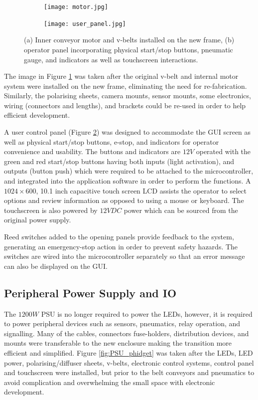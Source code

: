 \documentclass[fleqn,twoside,12pt]{report}
\begin{document}
\begin{figure}[h]
	\centering
	\begin{subfigure}{0.5\textwidth}
		\centering
		\texttt{[image: motor.jpg]}
		\caption{}
		\label{fig:motor}
	\end{subfigure}%
	\begin{subfigure}{0.5\textwidth}
		\centering
		\texttt{[image: user\_panel.jpg]}
		\caption{}
		\label{fig:user_panel}
	\end{subfigure}%
	\caption{(a) Inner conveyor motor and v-belts installed on the new frame, (b) operator panel incorporating physical start/stop buttons, pneumatic gauge, and indicators as well as touchscreen interactions.}
	\label{}
\end{figure}

The image in Figure \ref{fig:motor} was taken after the original v-belt and internal motor system were installed on the new frame, eliminating the need for re-fabrication. Similarly, the polarising sheets, camera mounts, sensor mounts, some electronics, wiring (connectors and lengths), and brackets could be re-used in order to help efficient development.

A user control panel (Figure \ref{fig:user_panel}) was designed to accommodate the GUI screen as well as physical start/stop buttons, e-stop, and indicators for operator convenience and usability. The buttons and indicators are $12V$ operated with the green and red start/stop buttons having both inputs (light activation), and outputs (button push) which were required to be attached to the microcontroller, and integrated into the application software in order to perform the functions. A $1024\times 600$, 10.1 inch capacitive touch screen LCD assists the operator to select options and review information as opposed to using a mouse or keyboard. The touchscreen is also powered by $12VDC$ power which can be sourced from the original power supply.

Reed switches added to the opening panels provide feedback to the system, generating an emergency-stop action in order to prevent safety hazards. The switches are wired into the microcontroller separately so that an error message can also be displayed on the GUI.



\subsection{Peripheral Power Supply and IO}

The $1200W$ PSU is no longer required to power the LEDs, however, it is required to power peripheral devices such as sensors, pneumatics, relay operation, and signalling. Many of the cables, connectors fuse-holders, distribution devices, and mounts were transferable to the new enclosure making the transition more efficient and simplified. Figure \ref{fig:PSU_phidget} was taken after the LEDs, LED power, polarising/diffuser sheets, v-belts, electronic control systems, control panel and touchscreen were installed, but prior to the belt conveyors and pneumatics to avoid complication and overwhelming the small space with electronic development.
\end{document}
